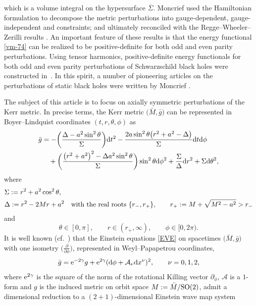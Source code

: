 \documentclass[pdftex]{sigma}
\def\ptl{\partial}%
\def\olin#1{\overline{#1}{}}%
\numberwithin{equation}{section}
\begin{document}
which is a volume integral on the hypersurface $\olin{\Sigma}$.
Moncrief used the Hamiltonian formulation to decompose the metric perturbations into gauge-dependent, gauge-independent and constraints; and ultimately reconciled with the Regge--Wheeler--Zerilli results \cite{Regge-Wheeler_57,Zerilli_70}. An important feature of these results is that the energy functional \eqref{vm-74} can be realized to be positive-definite for both odd and even parity perturbations. Using tensor harmonics, positive-definite energy functionals for both odd and even parity perturbations of Schwarzschild black holes were constructed in~\cite{Moncrief_74}. In this spirit, a number of pioneering articles on the perturbations of static black holes were written by Moncrief \cite{Moncrief_74_1,Moncrief_74_2,Moncrief_74_3}.


The subject of this article is to focus on axially symmetric perturbations of the Kerr metric. In precise terms, the Kerr metric $\bigl(\bar{M}, \bar{g}\bigr)$ can be represented in Boyer--Lindquist coordinates $(t, r, \theta, \phi)$ as
\begin{align}
\bar{g} &{}= - \biggl(\frac{\Delta - a^2 \sin^2 \theta}{\Sigma} \biggr) {\rm d}t^2 - \frac{2a \sin^2 \theta \bigl(r^2 + a^2 -\Delta\bigr)}{\Sigma} {\rm d}t {\rm d}\phi \notag\\
&\quad{}+ \biggl(\frac{\bigl(r^2 +a^2\bigr)^2 -\Delta a^2 \sin^2 \theta}{\Sigma}\biggr) \sin^2 \theta {\rm d}\phi^2 + \frac{\Sigma}{\Delta} {\rm d}r^2 + \Sigma {\rm d}\theta^2, \label{BL-Kerr}
\end{align}
where
\begin{align*}
&\Sigma := r^2 + a^2 \cos^2 \theta, \\
&\Delta := r^2 -2Mr + a^2 \quad \textnormal{with the real roots} \ \{r_-,r_+\}, \qquad
 r_{+} := M + \sqrt{M^2- a^2} > r_{-}
\end{align*}
and
\[
\theta \in [0, \pi],\qquad r \in (r_+, \infty),\qquad \phi \in [0, 2\pi).
\]
It is well known (cf.\ \cite{YCB-VM96, Ycb-Mon_01, diss_13}) that the Einstein equations \eqref{EVE} on spacetimes $\bigl(\bar{M}, \bar{g}\bigr)$ with one isometry $\bigl(\frac{\ptl}{\ptl \phi}\bigr)$, represented in Weyl--Papapetrou coordinates,
\begin{align*}
\bar{g} = {\rm e}^{-2\gamma} g + {\rm e}^{2\gamma} ({\rm d}\phi + \mathcal{A}_\nu {\rm d}x^\nu)^2, \qquad \nu= 0, 1, 2,
\end{align*}
where ${\rm e}^{2 \gamma}$ is the square of the norm of the rotational Killing vector $\ptl_\phi$, $\mathcal{A}$ is a $1$-form and $g$ is the induced metric on orbit space $M := \bar{M}/{\rm SO}(2)$, admit a dimensional reduction to a $(2 + 1)$-dimensional Einstein wave map system
\end{document}
